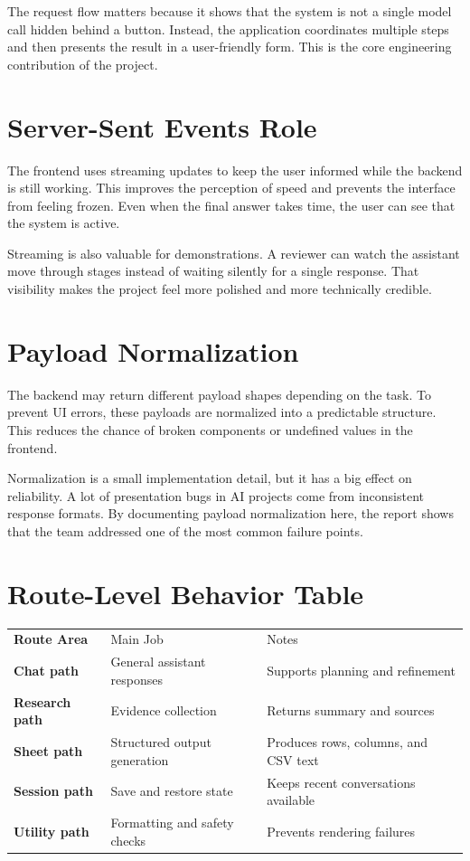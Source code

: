 \documentclass[11pt,oneside]{report}
\begin{document}
The request flow matters because it shows that the system is not a single model call hidden behind a button. Instead, the application coordinates multiple steps and then presents the result in a user-friendly form. This is the core engineering contribution of the project.

\section{Server-Sent Events Role}
The frontend uses streaming updates to keep the user informed while the backend is still working. This improves the perception of speed and prevents the interface from feeling frozen. Even when the final answer takes time, the user can see that the system is active.

Streaming is also valuable for demonstrations. A reviewer can watch the assistant move through stages instead of waiting silently for a single response. That visibility makes the project feel more polished and more technically credible.

\section{Payload Normalization}
The backend may return different payload shapes depending on the task. To prevent UI errors, these payloads are normalized into a predictable structure. This reduces the chance of broken components or undefined values in the frontend.

Normalization is a small implementation detail, but it has a big effect on reliability. A lot of presentation bugs in AI projects come from inconsistent response formats. By documenting payload normalization here, the report shows that the team addressed one of the most common failure points.

\section{Route-Level Behavior Table}
\begin{tabularx}{\textwidth}{>{\bfseries}p{}p{}X}
Route Area & Main Job & Notes \\
Chat path & General assistant responses & Supports planning and refinement \\
Research path & Evidence collection & Returns summary and sources \\
Sheet path & Structured output generation & Produces rows, columns, and CSV text \\
Session path & Save and restore state & Keeps recent conversations available \\
Utility path & Formatting and safety checks & Prevents rendering failures \\
\end{tabularx}
\end{document}
